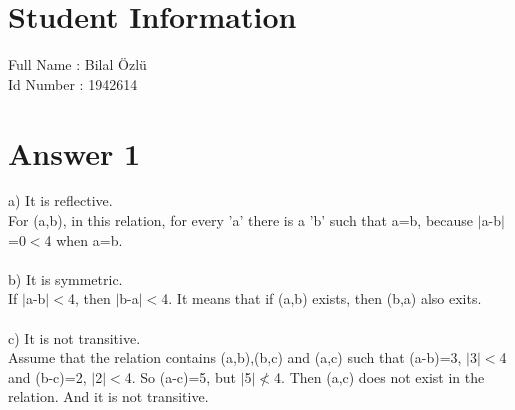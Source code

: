 \documentclass[12pt]{article}
\begin{document}
\section*{Student Information } 
Full Name : Bilal Özlü \\
Id Number : 1942614 \\

\section*{Answer 1}
 a) It is reflective. \\
 For (a,b), in this relation, for every 'a' there is a 'b' such  that a=b, because $\vert$a-b$\vert$=0$<$4 when a=b. \\
 \\
 b) It is symmetric. \\
 If $\vert$a-b$\vert$$<$4, then $\vert$b-a$\vert$$<$4. It means that if (a,b) exists, then (b,a) also exits. \\
 \\ 
 c) It is not transitive. \\
 Assume that the relation contains (a,b),(b,c) and (a,c) such that (a-b)=3, $\vert$3$\vert$$<$4  and (b-c)=2, $\vert$2$\vert$$<$4. So (a-c)=5, but $\vert$5$\vert$$\nless$4. Then (a,c) does not exist in the relation. And it is not transitive. \\
 
\end{document}
